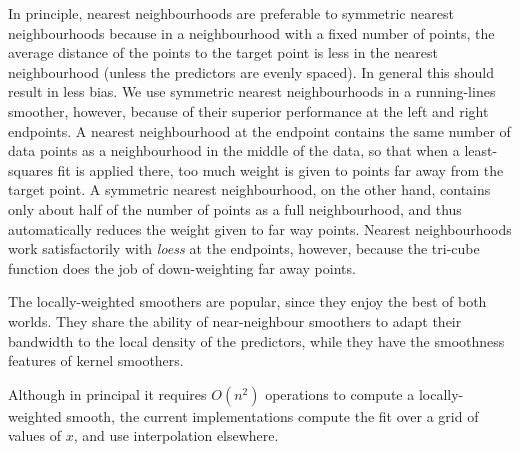 %
%
%
%
In principle, nearest neighbourhoods 
are preferable to 
symmetric nearest neighbourhoods because in a  neighbourhood with 
a fixed number of points, the average distance of the points to the target point
is less in the nearest neighbourhood (unless the predictors are evenly spaced).
In general this  should result in less bias.
%
%
We use symmetric nearest neighbourhoods in a running-lines smoother, however,
because of their superior performance at the left and right endpoints.
%
%
%
A nearest neighbourhood at the endpoint contains the same number of data
points
as a neighbourhood in the middle of the data,
 so that when a least-squares fit is applied there, too much
weight is given to points far away from the target point.
%
A symmetric nearest neighbourhood, on the other hand, contains only about
half of the number of points as a full neighbourhood, and thus  
automatically reduces the weight given to far way points.
%
%
Nearest neighbourhoods work satisfactorily with {\sl loess} at the endpoints, however,
because the tri-cube function does the job of down-weighting far away points.

%
The locally-weighted smoothers are popular, since they enjoy the best of both worlds. 
They share the ability of near-neighbour smoothers to adapt their bandwidth 
to the local density of the predictors, while they have the smoothness features
of kernel smoothers.

Although in principal it requires $O(n^2)$ operations to compute a locally-weighted smooth, the current implementations compute the fit over a grid of values of $x$, and use interpolation elsewhere.

%
%
%
\Sectionskip


